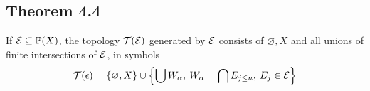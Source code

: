 \documentclass[../../main.tex]{subfiles}
\begin{document}
\subsection{Theorem 4.4}
\begin{wts}
    If $\mathcal{E}\subseteq\mathbb{P}(X)$, the topology $\mathcal{T}(\mathcal{E})$ generated by $\mathcal{E}$ consists of $\varnothing, X$ and all unions of finite intersections of $\mathcal{E}$, in symbols
    \[
    \mathcal{T}(\epsilon)=\{\varnothing, X\}\cup\left\{\bigcup W_\alpha,\:W_\alpha = \bigcap E_{j\leq n},\: E_j\in\mathcal{E}\right\}
    \]
\end{wts}
\end{document}
